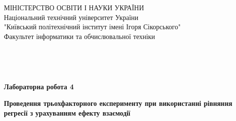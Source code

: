 \begin{titlepage}
     \begin{center}
      {\selectfont МІНІСТЕРСТВО ОСВІТИ І НАУКИ УКРАЇНИ} \\
      Національний технічний університет України
      \\ "Київський політехнічний інститут імені Ігоря Сікорського"
      \\ Факультет інформатики та обчислювальної техніки
     \end{center}  

    $\;$
    
    $\;$
    
    $\;$
    
    $\;$
    
    $\;$
    
    \vspace{0.5cm}
    \begin{center}
     {\large\textbf{Лабораторна робота 4}\par}
     \vspace{0.5cm}
     \textbf{Проведення трьохфакторного експерименту
     при використанні рівняння регресії з урахуванням ефекту взаємодії}
    \end{center}
    \vspace{2.5cm}


\end{titlepage}

